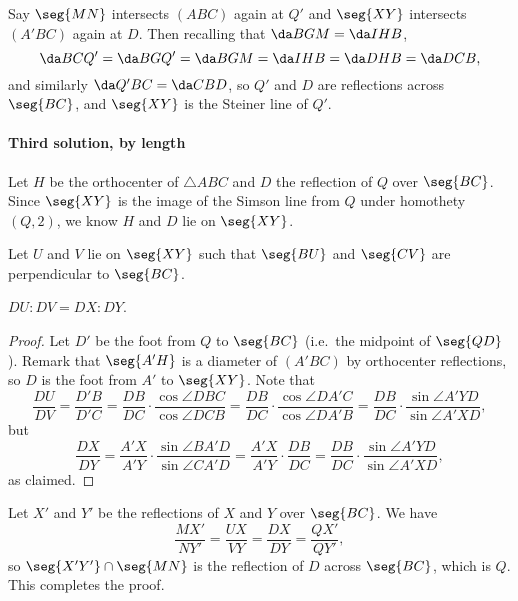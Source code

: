 Say $\seg{MN}$ intersects $(ABC)$ again at $Q'$ and $\seg{XY}$ intersects $(A'BC)$ again at $D$. Then recalling that $\da BGM=\da IHB$, \[\da BCQ'=\da BGQ'=\da BGM=\da IHB=\da DHB=\da DCB,\]
and similarly $\da Q'BC=\da CBD$, so $Q'$ and $D$ are reflections across $\seg{BC}$, and $\seg{XY}$ is the Steiner line of $Q'$.

\paragraph{Third solution, by length}     Let $H$ be the orthocenter of $\triangle ABC$ and $D$ the reflection of $Q$ over $\seg{BC}$. Since $\seg{XY}$ is the image of the Simson line from $Q$ under homothety $(Q,2)$, we know $H$ and $D$ lie on $\seg{XY}$.

Let $U$ and $V$ lie on $\seg{XY}$ such that $\seg{BU}$ and $\seg{CV}$ are perpendicular to $\seg{BC}$.
\begin{claim*}
    $DU:DV=DX:DY$.
\end{claim*}
\begin{proof}
    Let $D'$ be the foot from $Q$ to $\seg{BC}$ (i.e.\ the midpoint of $\seg{QD}$). Remark that $\seg{A'H}$ is a diameter of $(A'BC)$ by orthocenter reflections, so $D$ is the foot from $A'$ to $\seg{XY}$. Note that \[\frac{DU}{DV}=\frac{D'B}{D'C}=\frac{DB}{DC}\cdot\frac{\cos\angle DBC}{\cos\angle DCB}=\frac{DB}{DC}\cdot\frac{\cos\angle DA'C}{\cos\angle DA'B}=\frac{DB}{DC}\cdot\frac{\sin\angle A'YD}{\sin\angle A'XD},\]
    but \[\frac{DX}{DY}=\frac{A'X}{A'Y}\cdot\frac{\sin\angle BA'D}{\sin\angle CA'D}=\frac{A'X}{A'Y}\cdot\frac{DB}{DC}=\frac{DB}{DC}\cdot\frac{\sin\angle A'YD}{\sin\angle A'XD},\]
    as claimed.
\end{proof}

Let $X'$ and $Y'$ be the reflections of $X$ and $Y$ over $\seg{BC}$. We have \[\frac{MX'}{NY'}=\frac{UX}{VY}=\frac{DX}{DY}=\frac{QX'}{QY'},\]
so $\seg{X'Y'}\cap\seg{MN}$ is the reflection of $D$ across $\seg{BC}$, which is $Q$. This completes the proof.

